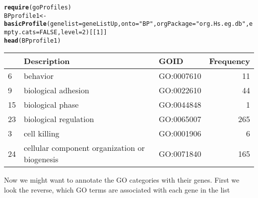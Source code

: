 \documentclass{article}\usepackage[]{graphicx}\usepackage[]{color}
\makeatletter
\newcommand{\hlnum}[1]{\textcolor[rgb]{0.686,0.059,0.569}{#1}}%
\newcommand{\hlstr}[1]{\textcolor[rgb]{0.192,0.494,0.8}{#1}}%
\newcommand{\hlstd}[1]{\textcolor[rgb]{0.345,0.345,0.345}{#1}}%
\newcommand{\hlkwb}[1]{\textcolor[rgb]{0.69,0.353,0.396}{#1}}%
\newcommand{\hlkwc}[1]{\textcolor[rgb]{0.333,0.667,0.333}{#1}}%
\newcommand{\hlkwd}[1]{\textcolor[rgb]{0.737,0.353,0.396}{\textbf{#1}}}%
\newenvironment{kframe}{%
 \def\at@end@of@kframe{}%
 \ifinner\ifhmode%
  \def\at@end@of@kframe{\end{minipage}}%
  \begin{minipage}{\columnwidth}%
 \fi\fi%
 \def\FrameCommand##1{\hskip\@totalleftmargin \hskip-\fboxsep
 \colorbox{shadecolor}{##1}\hskip-\fboxsep
     \hskip-\linewidth \hskip-\@totalleftmargin \hskip\columnwidth}%
 \MakeFramed {\advance\hsize-\width
   \@totalleftmargin\z@ \linewidth\hsize
   \@setminipage}}%
 {\par\unskip\endMakeFramed%
 \at@end@of@kframe}
\newenvironment{knitrout}{}{} %
\makeatother
\begin{document}
\begin{knitrout}
\color{fgcolor}\begin{kframe}
\begin{alltt}
\hlkwd{require}\hlstd{(goProfiles)}
\hlstd{BPprofile1}\hlkwb{<-} \hlkwd{basicProfile}\hlstd{(}\hlkwc{genelist}\hlstd{=geneListUp,} \hlkwc{onto}\hlstd{=}\hlstr{"BP"}\hlstd{,} \hlkwc{orgPackage}\hlstd{=}\hlstr{"org.Hs.eg.db"}\hlstd{,} \hlkwc{empty.cats}\hlstd{=}\hlnum{FALSE}\hlstd{,} \hlkwc{level}\hlstd{=}\hlnum{2}\hlstd{)[[}\hlnum{1}\hlstd{]]}
\hlkwd{head}\hlstd{(BPprofile1)}
\end{alltt}
\end{kframe}


\begin{tabular}{l|l|l|r}
\hline
  & Description & GOID & Frequency\\
\hline
6 & behavior & GO:0007610 & 11\\
\hline
9 & biological adhesion & GO:0022610 & 44\\
\hline
15 & biological phase & GO:0044848 & 1\\
\hline
23 & biological regulation & GO:0065007 & 265\\
\hline
3 & cell killing & GO:0001906 & 6\\
\hline
24 & cellular component organization or biogenesis & GO:0071840 & 165\\
\hline
\end{tabular}
\end{knitrout}

Now we might want to annotate the GO categories with their genes.
First we look the reverse, which GO terms are associated with each gene in the list
\end{document}
